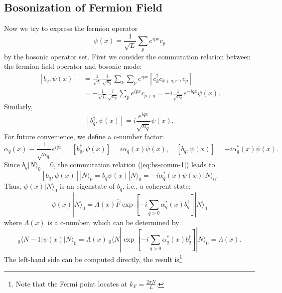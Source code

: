 \subsection{Bosonization of Fermion Field}
Now we try to express the fermion operator 
\begin{equation}
	\psi(x) = \frac{1}{\sqrt{L}} \sum_p e^{ipx} c_{p}
\end{equation}
by the bosonic operator set.
First we consider the commutation relation between the fermion field operator and bosonic mode:
\begin{equation}\label{eq:bs-comm-1}
\begin{aligned}
	\left[b_q,\psi(x)\right] &= \frac{1}{\sqrt L}\frac{i}{\sqrt{n_q}}\sum_{k}\sum_{p} e^{ipx} [c^\dagger_{k}c_{k+q,r'},c_{p}] \\
	&= -\frac{1}{\sqrt L} \frac{i}{\sqrt{n_q}} \sum_{p} e^{ipx} c_{p+q} 
	= -i\frac{1}{\sqrt{n_q}} e^{-iqx} \psi(x).
\end{aligned}
\end{equation}
Similarly,
\begin{equation}\label{eq:bs-comm-2}
	\left[b_q^\dagger,\psi(x)\right] = i\frac{e^{iqx}}{\sqrt{n_q}} \psi(x).
\end{equation}
For future convenience, we define a c-number factor:
\begin{equation}
	\alpha_q(x) \equiv \frac{1}{\sqrt{n_q}} e^{iqx},\quad
	[b_q^\dagger,\psi(x)] = i\alpha_q(x) \psi(x),\quad
	[b_q,\psi(x)] = -i \alpha^*_q(x) \psi(x).
\end{equation}
Since $b_q|N\rangle_0 = 0$, the commutation relation (\ref{eq:bs-comm-1}) leads to
\begin{equation}
	\left[b_{q}, \psi(x)\right]|N\rangle_{0} 
	=b_{q} \psi(x)|N\rangle_{0} 
	= -i\alpha_q^*(x) \psi(x)|N\rangle_{0}.
\end{equation}
Thus, $\psi(x)|N\rangle_0$ is an eigenstate of $b_q$, i.e., a coherent state:
\begin{equation}
	\psi(x)|N\rangle_0 
	= \Lambda(x) \hat F \exp\left[-i\sum_{q>0} \alpha_q^*(x) b_q^\dagger\right]|N\rangle_0
\end{equation}
where $\Lambda(x)$ is a c-number, which can be determined by
\begin{equation*}
	{}_{0}\langle N-1|\psi(x)| N\rangle_{0}=\Lambda(x)\ {}_{0}\langle N|\exp \left[-i\sum_{q>0} \alpha^*_q(x) b_{q}^{\dagger}\right]| N\rangle_{0} = \Lambda(x).
\end{equation*}
The left-hand side can be computed directly, the result is\footnote{Note that the Fermi point locates at $k_F=\frac{2\pi N}{L}$.}
